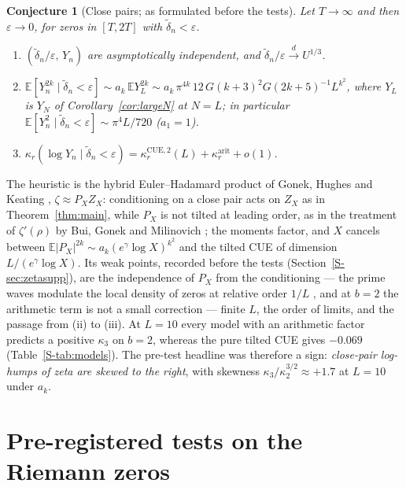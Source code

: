 \documentclass[12pt]{amsart}
\newtheorem{conjecture}[theorem]{Conjecture}
\theoremstyle{remark}
\newcommand{\E}{\mathbb{E}}
\newcommand{\eps}{\varepsilon}
\newcommand{\1}{\mathbf{1}}
\begin{document}
\begin{conjecture}[Close pairs; as formulated before the tests]\label{conj:zeta}
Let $T\to\infty$ and then $\eps\to0$, for zeros in $[T,2T]$ with
$\tilde\delta_n<\eps$.
\begin{enumerate}
\item[(i)] $(\tilde\delta_n/\eps,\,Y_n)$ are asymptotically independent,
and $\tilde\delta_n/\eps\overset d\to U^{1/3}$.
\item[(ii)] $\E[Y_n^{2k}\mid\tilde\delta_n<\eps]\sim a_k\,\E Y_L^{2k}\sim
a_k\,\pi^{4k}\,12\,G(k+3)^2G(2k+5)^{-1}L^{k^2}$, where $Y_L$ is $Y_N$ of
Corollary~\ref{cor:largeN} at $N=L$; in particular
$\E[Y_n^2\mid\tilde\delta_n<\eps]\sim\pi^4L/720$ ($a_1=1$).
\item[(iii)] $\kappa_r(\log Y_n\mid\tilde\delta_n<\eps)
=\kappa_r^{\mathrm{CUE},2}(L)+\kappa_r^{\mathrm{arit}}+o(1)$.
\end{enumerate}
\end{conjecture}

The heuristic is the hybrid Euler--Hadamard product of Gonek, Hughes and
Keating \cite{GHK07}, $\zeta\approx P_XZ_X$: conditioning on a close pair
acts on $Z_X$ as in Theorem~\ref{thm:main}, while $P_X$ is not tilted at
leading order, as in the treatment of $\zeta'(\rho)$ by Bui, Gonek and
Milinovich \cite{BGM15}; the moments factor, and $X$ cancels between
$\E|P_X|^{2k}\sim a_k(e^\gamma\log X)^{k^2}$ and the tilted CUE of dimension
$L/(e^\gamma\log X)$. Its weak points, recorded before the tests
(Section~\ref{S-sec:zetasupp}), are the independence of $P_X$ from the
conditioning --- the prime waves modulate the local density of zeros at
relative order $1/L$ \cite{Landau12,Gonek93,companion2}, and at $b=2$ the
arithmetic term is not a small correction --- finite $L$, the order of
limits, and the passage from (ii) to (iii). At $L=10$ every model with an
arithmetic factor predicts a positive $\kappa_3$ on $b=2$, whereas the pure
tilted CUE gives $-0.069$ (Table~\ref{S-tab:models}). The pre-test headline
was therefore a sign: \emph{close-pair log-humps of zeta are skewed to the
right}, with skewness $\kappa_3/\kappa_2^{3/2}\approx+1.7$ at $L=10$ under
$a_k$.

\section{Pre-registered tests on the Riemann zeros}\label{sec:tests}
\end{document}
